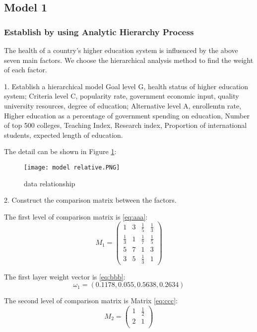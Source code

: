 \documentclass[12pt]{article}  %
\begin{document}
\subsection{Model 1}
\subsubsection{Establish by using Analytic Hierarchy Process\cite{8}}
The health of a country's higher education system is influenced by the above seven main factors. We choose the hierarchical analysis method to find the weight of each factor.

1. Establish a hierarchical model
Goal level G, health status of higher education system; Criteria level C, popularity rate, government economic input, quality university resources, degree of education; Alternative level A, enrollemtn rate, Higher education as a percentage of government spending on education, Number of top 500 colleges, Teaching Index, Research index, Proportion of international students, expected length of education.

The detail can be shown in Figure \ref{fig:overall}: %
\begin{figure}[htbp]
	\centering
	\texttt{[image: model relative.PNG]}
	\caption{data relationship}\label{fig:overall}
\end{figure}

2. Construct the comparison matrix between the factors.

The first level of comparison matrix is  \eqref{eq:aaa}:
\begin{equation}\label{eq:aaa}%
M_1=\begin{pmatrix}
1&3&\frac{1}{5}&\frac{1}{3}\\
\frac{1}{3}&1&\frac{1}{7}&\frac{1}{5}\\
5&7&1&3\\
3&5&\frac{1}{3}&1
\end{pmatrix}
\end{equation}

The first layer weight vector is \eqref{eq:bbb}:
\begin{equation}\label{eq:bbb}%
\omega_1=(0.1178,0.055,0.5638,0.2634)
\end{equation}

The second level of comparison matrix is Matrix \eqref{eq:ccc}:
\begin{equation}\label{eq:ccc}%
M_2=\begin{pmatrix}
1&\frac{1}{2}\\
2&1\\
\end{pmatrix}
\end{equation}
\end{document}
